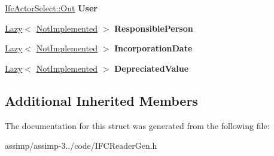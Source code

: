 \begin{DoxyCompactItemize}
\item 
\hypertarget{struct_assimp_1_1_i_f_c_1_1_ifc_asset_ac237536aaf91ad802bd329183cc9d30f}{\hyperlink{classboost_1_1shared__ptr}{Ifc\+Actor\+Select\+::\+Out} {\bfseries User}}\label{struct_assimp_1_1_i_f_c_1_1_ifc_asset_ac237536aaf91ad802bd329183cc9d30f}

\item 
\hypertarget{struct_assimp_1_1_i_f_c_1_1_ifc_asset_af8adfc850aa12675f2ebf011cf273064}{\hyperlink{struct_assimp_1_1_s_t_e_p_1_1_lazy}{Lazy}$<$ \hyperlink{struct_assimp_1_1_i_f_c_1_1_not_implemented}{Not\+Implemented} $>$ {\bfseries Responsible\+Person}}\label{struct_assimp_1_1_i_f_c_1_1_ifc_asset_af8adfc850aa12675f2ebf011cf273064}

\item 
\hypertarget{struct_assimp_1_1_i_f_c_1_1_ifc_asset_afcdaaeea61b8972424a368762e8ddaeb}{\hyperlink{struct_assimp_1_1_s_t_e_p_1_1_lazy}{Lazy}$<$ \hyperlink{struct_assimp_1_1_i_f_c_1_1_not_implemented}{Not\+Implemented} $>$ {\bfseries Incorporation\+Date}}\label{struct_assimp_1_1_i_f_c_1_1_ifc_asset_afcdaaeea61b8972424a368762e8ddaeb}

\item 
\hypertarget{struct_assimp_1_1_i_f_c_1_1_ifc_asset_a81571bfa5b75f50cd3cbb22c94543ae4}{\hyperlink{struct_assimp_1_1_s_t_e_p_1_1_lazy}{Lazy}$<$ \hyperlink{struct_assimp_1_1_i_f_c_1_1_not_implemented}{Not\+Implemented} $>$ {\bfseries Depreciated\+Value}}\label{struct_assimp_1_1_i_f_c_1_1_ifc_asset_a81571bfa5b75f50cd3cbb22c94543ae4}

\end{DoxyCompactItemize}
\subsection*{Additional Inherited Members}


The documentation for this struct was generated from the following file\+:\begin{DoxyCompactItemize}
\item 
assimp/assimp-\/3../code/I\+F\+C\+Reader\+Gen.\+h\end{DoxyCompactItemize}
